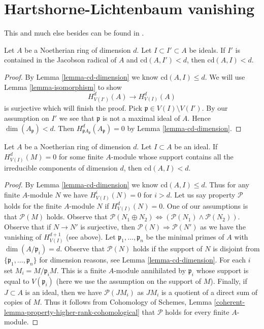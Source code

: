 \section{Hartshorne-Lichtenbaum vanishing}
\label{section-Hartshorne-Lichtenbaum-vanishing}

\noindent
This and much else besides can be found in \cite{CD}.

\begin{lemma}
\label{lemma-cd-top-vanishing}
Let $A$ be a Noetherian ring of dimension $d$. Let $I \subset I' \subset A$
be ideals. If $I'$ is contained in the Jacobson radical
of $A$ and $\text{cd}(A, I') < d$, then $\text{cd}(A, I) < d$.
\end{lemma}

\begin{proof}
By Lemma \ref{lemma-cd-dimension} we know $\text{cd}(A, I) \leq d$.
We will use Lemma \ref{lemma-isomorphism} to show
$$
H^d_{V(I')}(A) \to H^d_{V(I)}(A)
$$
is surjective which will finish the proof. Pick
$\mathfrak p \in V(I) \setminus V(I')$. By our assumption
on $I'$ we see that $\mathfrak p$ is not a maximal ideal of $A$.
Hence $\dim(A_\mathfrak p) < d$. Then
$H^d_{\mathfrak pA_\mathfrak p}(A_\mathfrak p) = 0$
by Lemma \ref{lemma-cd-dimension}.
\end{proof}

\begin{lemma}
\label{lemma-cd-top-vanishing-some-module}
Let $A$ be a Noetherian ring of dimension $d$. Let $I \subset A$
be an ideal. If $H^d_{V(I)}(M) = 0$ for some finite $A$-module
whose support contains all the irreducible components of
dimension $d$, then $\text{cd}(A, I) < d$.
\end{lemma}

\begin{proof}
By Lemma \ref{lemma-cd-dimension} we know $\text{cd}(A, I) \leq d$.
Thus for any finite $A$-module $N$ we have $H^i_{V(I)}(N) = 0$
for $i > d$. Let us say property $\mathcal{P}$ holds for the
finite $A$-module $N$ if $H^d_{V(I)}(N) = 0$.
One of our assumptions is that $\mathcal{P}(M)$ holds.
Observe that $\mathcal{P}(N_1 \oplus N_2)
\Leftrightarrow (\mathcal{P}(N_1) \wedge \mathcal{P}(N_2))$.
Observe that if $N \to N'$ is surjective, then
$\mathcal{P}(N) \Rightarrow \mathcal{P}(N')$ as we
have the vanishing of $H^{d + 1}_{V(I)}$ (see above).
Let $\mathfrak p_1, \ldots, \mathfrak p_n$ be the
minimal primes of $A$ with $\dim(A/\mathfrak p_i) = d$.
Observe that $\mathcal{P}(N)$ holds if the support
of $N$ is disjoint from $\{\mathfrak p_1, \ldots, \mathfrak p_n\}$
for dimension reasons, see Lemma \ref{lemma-cd-dimension}.
For each $i$ set $M_i = M/\mathfrak p_i M$.
This is a finite $A$-module annihilated by $\mathfrak p_i$
whose support is equal to
$V(\mathfrak p_i)$ (here we use the assumption on the support of $M$).
Finally, if $J \subset A$ is an ideal, then we have $\mathcal{P}(JM_i)$
as $JM_i$ is a quotient of a direct sum of copies of $M$.
Thus it follows from Cohomology of Schemes, Lemma
\ref{coherent-lemma-property-higher-rank-cohomological}
that $\mathcal{P}$ holds for every finite $A$-module.
\end{proof}

